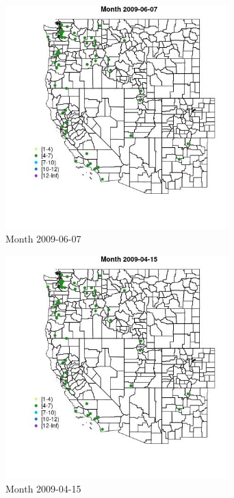 \begin{figure} 
\centering  
\includegraphics[width=0.77\textwidth]{Code_Outputs/Report_ML_input_PM25_Step4_part_e_de_duplicated_aves_MapObsMonth2009-06-07.jpg} 
\caption{\label{fig:Report_ML_input_PM25_Step4_part_e_de_duplicated_avesMapObsMonth2009-06-07}Month 2009-06-07} 
\end{figure} 
 

\begin{figure} 
\centering  
\includegraphics[width=0.77\textwidth]{Code_Outputs/Report_ML_input_PM25_Step4_part_e_de_duplicated_aves_MapObsMonth2009-04-15.jpg} 
\caption{\label{fig:Report_ML_input_PM25_Step4_part_e_de_duplicated_avesMapObsMonth2009-04-15}Month 2009-04-15} 
\end{figure} 
 

